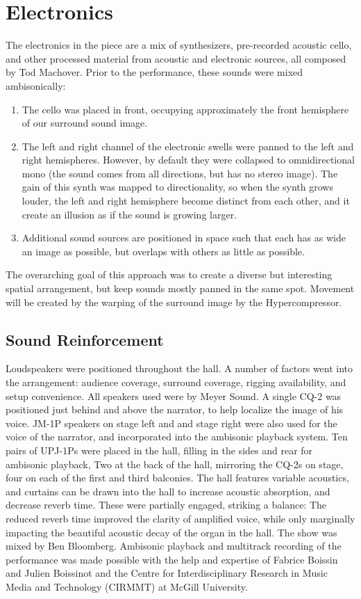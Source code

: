 \section{Electronics}
\label{sec:electronics}
The electronics in the piece are a mix of synthesizers, pre-recorded
acoustic cello, and other processed material from acoustic and
electronic sources, all composed by Tod Machover. Prior to the
performance, these sounds were mixed ambisonically:
\begin{enumerate}
\item The cello was placed in front, occupying approximately the front
  hemisphere of our surround sound image.
\item The left and right channel of the electronic swells were panned
  to the left and right hemispheres. However, by default they were
  collapsed to omnidirectional mono (the sound comes from all
  directions, but has no stereo image). The gain of this synth was
  mapped to directionality, so when the synth grows louder, the left
  and right hemisphere become distinct from each other, and it create
  an illusion as if the sound is growing larger.
\item Additional sound sources are positioned in space such that each
  has as wide an image as possible, but overlaps with others as little
  as possible.
\end{enumerate}
The overarching goal of this approach was to create a diverse but
interesting spatial arrangement, but keep sounds mostly panned in the
same spot. Movement will be created by the warping of the surround
image by the Hypercompressor.

\subsection{Sound Reinforcement}
\label{sec:sound-reinforcement}
Loudspeakers were positioned throughout the hall. A number of factors
went into the arrangement: audience coverage, surround coverage,
rigging availability, and setup convenience. All speakers used were by
Meyer Sound. A single CQ-2
was positioned just behind and above the narrator, to help localize
the image of his voice.  JM-1P speakers on stage left and and stage
right were also used for the voice of the narrator, and incorporated
into the ambisonic playback system. Ten pairs of UPJ-1Ps were placed in
the hall, filling in the sides and rear for ambisonic playback, Two at
the back of the hall, mirroring the CQ-2s on stage, four on each of
the first and third balconies.  The hall features variable acoustics,
and curtains can be drawn into the hall to increase acoustic
absorption, and decrease reverb time. These were partially engaged,
striking a balance: The reduced reverb time improved the clarity of
amplified voice, while only marginally impacting the beautiful
acoustic decay of the organ in the hall. The show was mixed by Ben
Bloomberg. Ambisonic playback and multitrack recording of the
performance was made possible with the help and expertise of Fabrice
Boissin and Julien Boissinot and the Centre for Interdisciplinary
Research in Music Media and Technology (CIRMMT) at McGill University.

